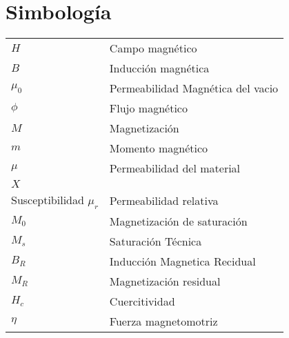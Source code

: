\chapter{Simbolog\'ia}


\begin{tabular}{ll}
	$H$\hspace{3cm} & Campo magn\'etico \\
	$B$\hspace{3cm} & Inducci\'on magn\'etica\\
	$\mu_0$\hspace{3cm} & Permeabilidad Magn\'etica del vacio \\
	$\phi$\hspace{3cm} & Flujo magn\'etico\\
	$M$\hspace{3cm} & Magnetizaci\'on\\
	$m$\hspace{3cm} & Momento magn\'etico\\
	$\mu$\hspace{3cm} & Permeabilidad del material\\ 
	$X$\hspace{3cm} & \\ Susceptibilidad
	$\mu_r$\hspace{3cm} & Permeabilidad relativa\\
	$M_0$\hspace{3cm} & Magnetizaci\'on de saturaci\'on\\
	$M_s$\hspace{3cm} & Saturaci\'on T\'ecnica\\
	$B_R$\hspace{3cm} & Inducci\'on Magnetica Recidual\\
	$M_R$\hspace{3cm} & Magnetizaci\'on residual\\
	$H_c$\hspace{3cm} & Cuercitividad\\
	$\eta$\hspace{3cm} & Fuerza magnetomotriz\\
\end{tabular}

